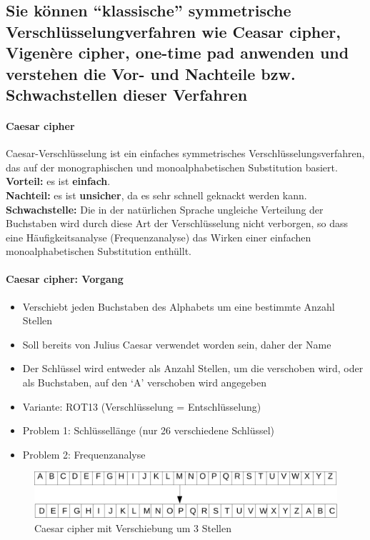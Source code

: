 \documentclass[10pt,a4paper]{article}
\begin{document}
\subsection*{Sie können "`klassische"' symmetrische Verschlüsselungverfahren wie Ceasar cipher, Vigenère cipher, one-time pad anwenden und verstehen die Vor- und Nachteile bzw. Schwachstellen dieser Verfahren}
\paragraph*{Caesar cipher}Caesar-Verschlüsselung ist ein einfaches symmetrisches Verschlüsselungsverfahren, das auf der monographischen und monoalphabetischen Substitution basiert.\\
\textbf{Vorteil:} es ist \textbf{einfach}.\\
\textbf{Nachteil:} es ist \textbf{unsicher}, da es sehr schnell geknackt werden kann.\\
\textbf{Schwachstelle:} Die in der natürlichen Sprache ungleiche Verteilung der Buchstaben wird durch diese Art der Verschlüsselung nicht verborgen, so dass eine Häufigkeitsanalyse (Frequenzanalyse) das Wirken einer einfachen monoalphabetischen Substitution enthüllt.

\paragraph*{Caesar cipher: Vorgang}
\begin{itemize}[noitemsep,topsep=0pt,leftmargin=*]
    \item Verschiebt jeden Buchstaben des Alphabets um eine bestimmte Anzahl Stellen
    \item Soll bereits von Julius Caesar verwendet worden sein, daher der Name
    \item Der Schlüssel wird entweder als Anzahl Stellen, um die verschoben wird, oder als Buchstaben, auf den `A' verschoben wird angegeben
    \item Variante: ROT13 (Verschlüsselung = Entschlüsselung)
    \item Problem 1: Schlüssellänge (nur 26 verschiedene Schlüssel)
    \item Problem 2: Frequenzanalyse
\end{itemize}
\begin{figure}[H]
    \begin{center}
    \includegraphics[width=12cm]{images/caesar.png}
    \caption{Caesar cipher mit Verschiebung um 3 Stellen}
    \label{caesar}
    \end{center}
\end{figure}
\end{document}
